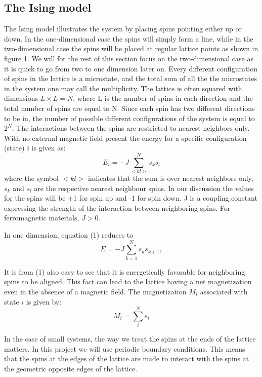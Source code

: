 \documentclass[a4paper,12pt]{article}
\begin{document}
\subsection{The Ising model}
The Ising model illustrates the system by placing spins pointing either up or down. In the one-dimensional case the spins will simply form a line, while in the two-dimensional case the spins will be placed at regular lattice points as shown in figure 1. We will for the rest of this section focus on the two-dimensional case as it is quick to go from two to one dimension later on. Every different configuration of spins in the lattice is a microstate, and  the total sum of all the the microstates in the system one may call the multiplicity. The lattice is often squared with dimensions $L \times L = N$, where L is the number of spins in each direction and the total number of spins are equal to N. Since each spin has two different directions to be in, the number of possible different configurations of the system is equal to $2^N$. The interactions between the spins are restricted to nearest neighbors only.\newline
With no external magnetic field present the energy for a specific configuration (state) $i$ is given as:
\begin{equation}
    E_i = -J \sum_{<kl>}^{N} s_k s_l
\end{equation}
where the symbol $<kl>$ indicates that the sum is over nearest neighbors only, $s_k$ and $s_l$ are the respective nearest neighbour spins. In our discussion the values for the spins will be +1 for spin up and -1 for spin down. J is a coupling constant expressing the strength of the interaction between neighboring spins. For ferromagnetic materials, $J > 0$.\newline

In one dimension, equation (1) reduces to
\begin{equation}
    E = - J\sum_{k=1}^{N} s_k s_{k+1},
\end{equation}

It is from (1) also easy to see that it is energetically favorable for neighboring spins to be aligned. This fact can lead to the lattice having a net magnetization even in the absence of a magnetic field.\newline
The magnetization $M_i$ associated with state $i$ is given by:
\begin{equation}
    M_i = \sum_{i}^{N}s_i
\end{equation}

In the case of small systems, the way we treat the spins at the ends of the lattice matters. In this project we will use periodic boundary conditions. This means that the spins at the edges of the lattice are made to interact with the spins at the geometric opposite edges of the lattice.\newline
\end{document}
